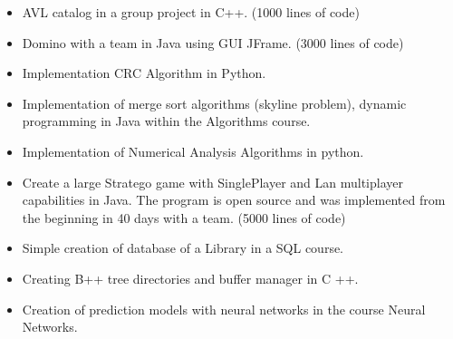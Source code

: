 \documentclass[a4paper,10pt]{article}
\begin{document}
\begin{itemize}[leftmargin=150pt]
        \item AVL catalog in a group project in C++. (1000 lines of code)
        
\end{itemize}
\begin{itemize}[leftmargin=150pt]
        \item  Domino with a team in Java using GUI JFrame. (3000 lines of code)
        
\end{itemize}
\begin{itemize}[leftmargin=150pt]
        \item 	Implementation  CRC Algorithm in Python. 
        
\end{itemize}
\begin{itemize}[leftmargin=150pt]
        \item Implementation of merge sort algorithms (skyline problem), dynamic programming in Java within the Algorithms course.
        
\end{itemize}
\begin{itemize}[leftmargin=150pt]
        \item Implementation of Numerical Analysis Algorithms in python. 
        
\end{itemize}
\begin{itemize}[leftmargin=150pt]
        \item Create a large Stratego game with SinglePlayer and Lan multiplayer capabilities in Java. The program is open source and was implemented from the beginning in 40 days with a team. (5000 lines of code)
        
\end{itemize}
\begin{itemize}[leftmargin=150pt]
        \item Simple creation of database of a Library in a SQL course.
        
\end{itemize}
\begin{itemize}[leftmargin=150pt]
        \item Creating B++ tree directories and buffer manager in C ++.
        
\end{itemize}
\begin{itemize}[leftmargin=150pt]
        \item Creation of prediction models with neural networks in the course Neural Networks.
        
\end{itemize}
\end{document}
